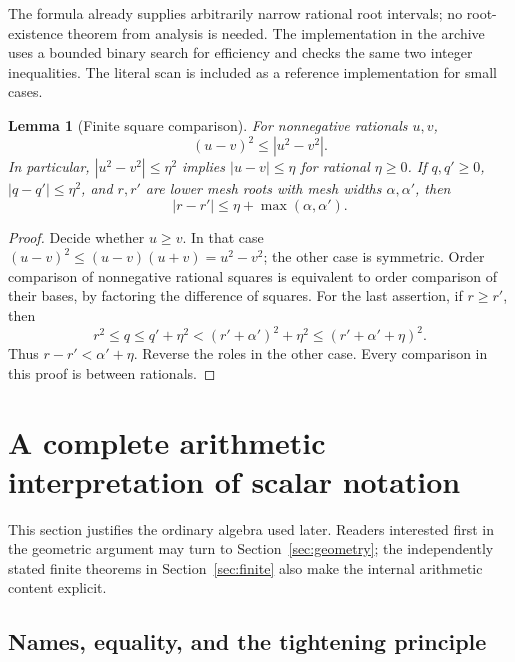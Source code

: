 \documentclass[11pt,a4paper]{article}
\newtheorem{lemma}[theorem]{Lemma}
\theoremstyle{definition}
\newcommand{\abs}[1]{\left|#1\right|}
\numberwithin{equation}{section}
\begin{document}
The formula already supplies arbitrarily narrow rational root intervals;
no root-existence theorem from analysis is needed. The implementation in
the archive uses a bounded binary search for efficiency and checks
the same two integer inequalities. The literal scan is included as a
reference implementation for small cases.

\begin{lemma}[Finite square comparison]\label{lem:square-compare}
For nonnegative rationals \(u,v\),
\[
 (u-v)^2\le\abs{u^2-v^2}.
 \tag{2.4}\label{eq:square-compare}
\]
In particular, \(\abs{u^2-v^2}\le\eta^2\) implies
\(\abs{u-v}\le\eta\) for rational \(\eta\ge0\).
If \(q,q'\ge0\), \(\abs{q-q'}\le\eta^2\), and \(r,r'\)
are lower mesh roots with mesh widths \(\alpha,\alpha'\), then
\[
 \abs{r-r'}\le\eta+\max(\alpha,\alpha').
 \tag{2.5}\label{eq:mesh-stability}
\]
\end{lemma}

\begin{proof}
Decide whether \(u\ge v\). In that case
\((u-v)^2\le(u-v)(u+v)=u^2-v^2\); the other case is symmetric.
Order comparison of nonnegative rational squares is equivalent to order
comparison of their bases, by factoring the difference of squares.
For the last assertion, if \(r\ge r'\), then
\[
 r^2\le q\le q'+\eta^2
 <(r'+\alpha')^2+\eta^2
 \le(r'+\alpha'+\eta)^2.
\]
Thus \(r-r'<\alpha'+\eta\). Reverse the roles in the other case.
Every comparison in this proof is between rationals.
\end{proof}

\section{A complete arithmetic interpretation of scalar notation}
\label{sec:names}

This section justifies the ordinary algebra used later. Readers interested
first in the geometric argument may turn to Section~\ref{sec:geometry};
the independently stated finite theorems in Section~\ref{sec:finite} also
make the internal arithmetic content explicit.

\subsection{Names, equality, and the tightening principle}
\end{document}
